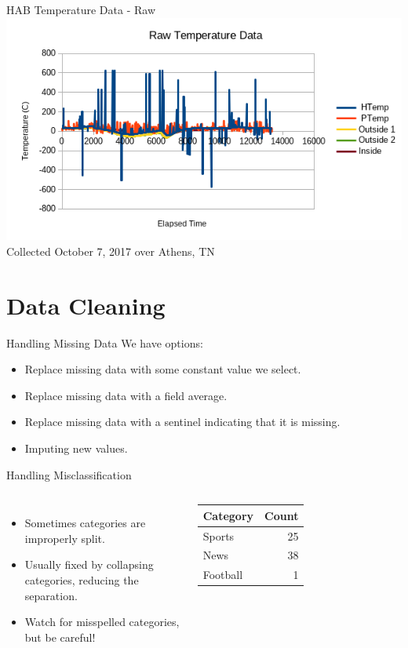 \documentclass[handout]{beamer}
\begin{document}
\begin{frame}{HAB Temperature Data - Raw}
\includegraphics[width=\textwidth]{images/rawtemp}
{\tiny Collected October 7, 2017 over Athens, TN}
\end{frame}

\section{Data Cleaning}
\begin{frame}{Handling Missing Data}
We have options:
\begin{itemize}[<+->]
  \item Replace missing data with some constant value we select.
  \item Replace missing data with a field average.
  \item Replace missing data with a sentinel indicating that it is missing.
  \item Imputing new values.
\end{itemize}
\end{frame}

\begin{frame}{Handling Misclassification}
\begin{columns}
  \begin{itemize}[<+->]
  \item Sometimes categories are improperly split.
  \item Usually fixed by collapsing categories, reducing the separation.
  \item Watch for misspelled categories, but be careful!
  \end{itemize}
  
  \begin{tabular}{l|r}
  {\bf Category} & {\bf Count} \\
  \hline
  Sports & 25 \\
  News & 38 \\
  Football & 1\\
  \end{tabular}
\end{columns}
\end{frame}
\end{document}
